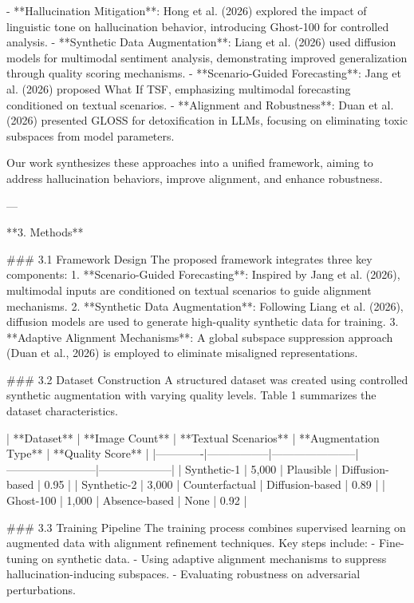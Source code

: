 - **Hallucination Mitigation**: Hong et al. (2026) explored the impact of linguistic tone on hallucination behavior, introducing Ghost-100 for controlled analysis.  
- **Synthetic Data Augmentation**: Liang et al. (2026) used diffusion models for multimodal sentiment analysis, demonstrating improved generalization through quality scoring mechanisms.  
- **Scenario-Guided Forecasting**: Jang et al. (2026) proposed What If TSF, emphasizing multimodal forecasting conditioned on textual scenarios.  
- **Alignment and Robustness**: Duan et al. (2026) presented GLOSS for detoxification in LLMs, focusing on eliminating toxic subspaces from model parameters.  

Our work synthesizes these approaches into a unified framework, aiming to address hallucination behaviors, improve alignment, and enhance robustness.

---

**3. Methods**  

### 3.1 Framework Design  
The proposed framework integrates three key components:  
1. **Scenario-Guided Forecasting**: Inspired by Jang et al. (2026), multimodal inputs are conditioned on textual scenarios to guide alignment mechanisms.  
2. **Synthetic Data Augmentation**: Following Liang et al. (2026), diffusion models are used to generate high-quality synthetic data for training.  
3. **Adaptive Alignment Mechanisms**: A global subspace suppression approach (Duan et al., 2026) is employed to eliminate misaligned representations.  

### 3.2 Dataset Construction  
A structured dataset was created using controlled synthetic augmentation with varying quality levels. Table 1 summarizes the dataset characteristics.

| **Dataset** | **Image Count** | **Textual Scenarios** | **Augmentation Type** | **Quality Score** |
|-------------|-----------------|-----------------------|------------------------|--------------------|
| Synthetic-1 | 5,000           | Plausible            | Diffusion-based        | 0.95              |
| Synthetic-2 | 3,000           | Counterfactual       | Diffusion-based        | 0.89              |
| Ghost-100   | 1,000           | Absence-based        | None                   | 0.92              |

### 3.3 Training Pipeline  
The training process combines supervised learning on augmented data with alignment refinement techniques. Key steps include:  
- Fine-tuning on synthetic data.  
- Using adaptive alignment mechanisms to suppress hallucination-inducing subspaces.  
- Evaluating robustness on adversarial perturbations.

